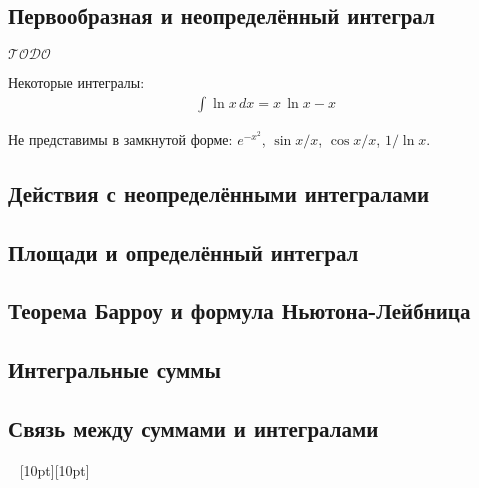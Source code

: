 \documentclass[a4paper,12pt]{article}
\numberwithin{figure}{section}
\theoremstyle{definition}
\def\todo{\guillemotleft$\mathcal{TODO}$\guillemotright\textellipsis}
\def\vignette{\vspace{48pt} \noindent \hrulefill~ \raisebox{-8pt}[10pt][10pt]{\Huge\ding{102}}~ \hrulefill}
\begin{document}
\subsection{Первообразная и неопределённый интеграл}

\todo

Некоторые интегралы:
\begin{align*}
&	\int \ln x \, dx = x \, \ln x - x
\end{align*}

Не представимы в замкнутой форме: $e^{-x^2}$, $\sin x/x$, $\cos x/x$, $1/\ln x$.


\subsection{Действия с неопределёнными интегралами}


\subsection{Площади и определённый интеграл}


\subsection{Теорема Барроу и формула Ньютона-Лейбница}


\subsection{Интегральные суммы}


\subsection{Связь между суммами и интегралами}

\vignette
\end{document}
